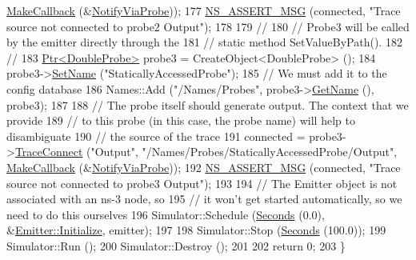 \begin{DoxyCode}
      \hyperlink{group__makecallbackmemptr_ga9376283685aa99d204048d6a4b7610a4}{MakeCallback} (&\hyperlink{double-probe-example_8cc_a2b89eb6cf8dc830f27ce00766bf62c68}{NotifyViaProbe}));
177   \hyperlink{assert_8h_aff5ece9066c74e681e74999856f08539}{NS\_ASSERT\_MSG} (connected, \textcolor{stringliteral}{"Trace source not connected to probe2 Output"});
178 
179   \textcolor{comment}{//}
180   \textcolor{comment}{// Probe3 will be called by the emitter directly through the}
181   \textcolor{comment}{// static method SetValueByPath().}
182   \textcolor{comment}{//}
183   \hyperlink{classns3_1_1Ptr}{Ptr<DoubleProbe>} probe3 = CreateObject<DoubleProbe> ();
184   probe3->\hyperlink{classns3_1_1DataCollectionObject_a9bf5a3af1190f7efadb1baae36889eaa}{SetName} (\textcolor{stringliteral}{"StaticallyAccessedProbe"});
185   \textcolor{comment}{// We must add it to the config database}
186   Names::Add (\textcolor{stringliteral}{"/Names/Probes"}, probe3->\hyperlink{classns3_1_1DataCollectionObject_a2e37eac50a8ff0b7d3030ed82132afdd}{GetName} (), probe3);
187 
188   \textcolor{comment}{// The probe itself should generate output.  The context that we provide}
189   \textcolor{comment}{// to this probe (in this case, the probe name) will help to disambiguate}
190   \textcolor{comment}{// the source of the trace}
191   connected = probe3->\hyperlink{classns3_1_1ObjectBase_ada3a45b34bc23114a25e0ab19188276e}{TraceConnect} (\textcolor{stringliteral}{"Output"}, \textcolor{stringliteral}{"/Names/Probes/StaticallyAccessedProbe/Output"}, 
      \hyperlink{group__makecallbackmemptr_ga9376283685aa99d204048d6a4b7610a4}{MakeCallback} (&\hyperlink{double-probe-example_8cc_a2b89eb6cf8dc830f27ce00766bf62c68}{NotifyViaProbe}));
192   \hyperlink{assert_8h_aff5ece9066c74e681e74999856f08539}{NS\_ASSERT\_MSG} (connected, \textcolor{stringliteral}{"Trace source not connected to probe3 Output"});
193 
194   \textcolor{comment}{// The Emitter object is not associated with an ns-3 node, so}
195   \textcolor{comment}{// it won't get started automatically, so we need to do this ourselves}
196   Simulator::Schedule (\hyperlink{group__timecivil_ga33c34b816f8ff6628e33d5c8e9713b9e}{Seconds} (0.0), &\hyperlink{classns3_1_1Object_af4411cb29971772fcd09203474a95078}{Emitter::Initialize}, emitter);
197 
198   Simulator::Stop (\hyperlink{group__timecivil_ga33c34b816f8ff6628e33d5c8e9713b9e}{Seconds} (100.0));
199   Simulator::Run ();
200   Simulator::Destroy ();
201 
202   \textcolor{keywordflow}{return} 0;
203 \}
\end{DoxyCode}


